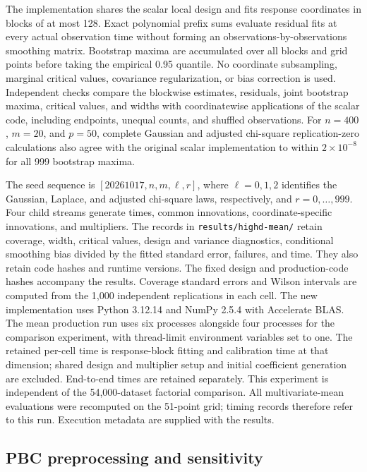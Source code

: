 The implementation shares the scalar local design and fits response
coordinates in blocks of at most 128. Exact polynomial prefix sums
evaluate residual fits at every actual observation time without forming
an observations-by-observations smoothing matrix. Bootstrap maxima are accumulated over all
blocks and grid points before taking the empirical 0.95 quantile.
No coordinate subsampling, marginal critical values, covariance
regularization, or bias correction is used. Independent checks compare
the blockwise estimates, residuals, joint bootstrap maxima, critical
values, and widths with coordinatewise applications of the scalar code,
including endpoints, unequal counts, and shuffled observations.
For $n=400$, $m=20$, and $p=50$, complete Gaussian and adjusted chi-square
replication-zero calculations also agree with the original scalar
implementation to within $2\times10^{-8}$ for all 999 bootstrap maxima.

The seed sequence is $[20261017,n,m,\ell,r]$, where $\ell=0,1,2$ identifies
the Gaussian, Laplace, and adjusted chi-square laws, respectively, and
$r=0,\ldots,999$. Four child streams generate times,
common innovations, coordinate-specific innovations, and multipliers. The records in
\texttt{results/highd-mean/} retain coverage, width, critical values,
design and variance diagnostics, conditional smoothing bias divided by
the fitted standard error, failures, and time. They also retain code
hashes and runtime versions. The fixed design and production-code hashes accompany the results. Coverage standard errors and Wilson intervals
are computed from the 1,000 independent replications in each cell.
The new implementation uses Python 3.12.14 and NumPy 2.5.4 with
Accelerate BLAS. The mean production run uses six processes alongside four processes
for the comparison experiment, with thread-limit environment variables
set to one. The retained per-cell time is
response-block fitting and calibration time at that dimension;
shared design and multiplier setup and initial coefficient generation
are excluded. End-to-end times are retained separately. This experiment
is independent of the 54,000-dataset factorial comparison. All multivariate-mean evaluations were recomputed on the 51-point grid;
timing records therefore refer to this run. Execution metadata are supplied
with the results.





\subsection{PBC preprocessing and sensitivity}

